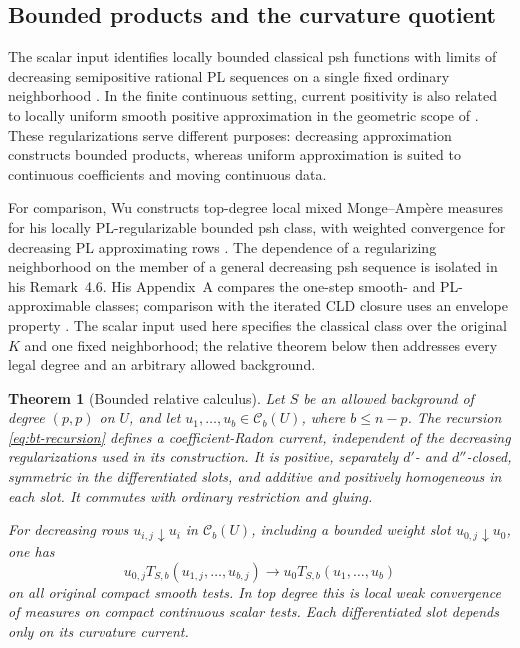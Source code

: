 \documentclass[11pt,a4paper]{article}
\newcommand{\MathEqref}[1]{{\hypersetup{linkcolor=EquationLink}\eqref{#1}}}
\newtheorem{theorem}{Theorem}[section]
\theoremstyle{definition}
\theoremstyle{remark}
\numberwithin{equation}{section}
\newcommand{\Cb}{\mathcal C_b}
\begin{document}
\subsection{Bounded products and the curvature quotient}

The scalar input identifies locally bounded classical psh functions
with limits of decreasing semipositive rational PL sequences on a
single fixed ordinary neighborhood \cite{B}.  In the finite continuous
setting, current positivity is also related to locally uniform smooth
positive approximation in the geometric scope of \cite{R}.  These
regularizations serve different purposes: decreasing approximation
constructs bounded products, whereas uniform approximation is suited
to continuous coefficients and moving continuous data.

For comparison, Wu constructs top-degree local mixed Monge--Amp\`ere
measures for his locally PL-regularizable bounded psh class, with
weighted convergence for decreasing PL approximating rows
\cite[Theorem~4.2, pp.~25--26]{Wu}.  The dependence of a
regularizing neighborhood on the member of a general decreasing psh
sequence is isolated in his Remark~4.6.  His Appendix~A compares the
one-step smooth- and PL-approximable classes; comparison with the
iterated CLD closure uses an envelope property
\cite[Remark~A.2 and Theorem~A.3, pp.~52--53]{Wu}.  The scalar input
used here specifies the classical class over the original $K$ and
one fixed neighborhood; the relative theorem below then addresses
every legal degree and an arbitrary allowed background.

\begin{theorem}[Bounded relative calculus]
\label{thm:bounded}
Let $S$ be an allowed background of degree $(p,p)$ on $U$, and let
$u_1,\ldots,u_b\in\Cb(U)$, where $b\le n-p$.  The recursion
\MathEqref{eq:bt-recursion} defines a coefficient-Radon current,
independent of the decreasing regularizations used in its construction.
It is positive, separately $d'$- and $d''$-closed, symmetric in the
differentiated slots, and additive and positively homogeneous in each
slot.  It commutes with ordinary restriction and gluing.

For decreasing rows $u_{i,j}\downarrow u_i$ in $\Cb(U)$, including a
bounded weight slot $u_{0,j}\downarrow u_0$, one has
\begin{equation}
 u_{0,j}T_{S,b}(u_{1,j},\ldots,u_{b,j})
       \longrightarrow u_0T_{S,b}(u_1,\ldots,u_b)
                         \label{eq:weighted-monotone}
\end{equation}
on all original compact smooth tests.  In top degree this is local
weak convergence of measures on compact continuous scalar tests.
Each differentiated slot depends only on its curvature current.
\end{theorem}
\end{document}
